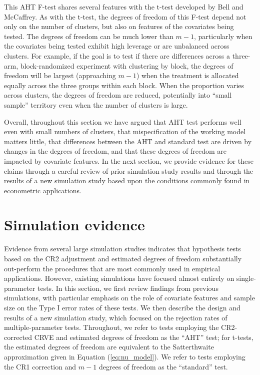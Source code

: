 \documentclass[12pt]{article}
\begin{document}
This AHT F-test shares several features with the t-test developed by Bell and McCaffrey. As with the t-test, the degrees of freedom of this F-test depend not only on the number of clusters, but also on features of the covariates being tested. 
The degrees of freedom can be much lower than $m - 1$, particularly when the covariates being tested exhibit high leverage or are unbalanced across clusters. 
For example, if the goal is to test if there are differences across a three-arm, block-randomized experiment with clustering by block, the degrees of freedom will be largest (approaching $m - 1$) when the treatment is allocated equally across the three groups within each block. 
When the proportion varies across clusters, the degrees of freedom are reduced, potentially into ``small sample'' territory even when the number of clusters is large. 

Overall, throughout this section we have argued that AHT test performs well even with small numbers of clusters, that mispecification of the working model matters little, that differences between the AHT and standard test are driven by changes in the degrees of freedom, and that these degrees of freedom are impacted by covariate features. 
In the next section, we provide evidence for these claims through a careful review of prior simulation study results and through the results of a new simulation study based upon the conditions commonly found in econometric applications.

\section{Simulation evidence}
\label{sec:simulation}

Evidence from several large simulation studies indicates that hypothesis tests based on the CR2 adjustment and estimated degrees of freedom substantially out-perform the procedures that are most commonly used in empirical applications.
However, existing simulations have focused almost entirely on single-parameter tests. 
In this section, we first review findings from previous simulations, with particular emphasis on the role of covariate features and sample size on the Type I error rates of these tests.
We then describe the design and results of a new simulation study, which focused on the rejection rates of multiple-parameter tests.
  Throughout, we refer to tests employing the CR2-corrected CRVE and estimated degrees of freedom as the ``AHT'' test; for t-tests, the estimated degrees of freedom are equivalent to the Satterthwaite approximation given in Equation (\ref{eq:nu_model}). 
We refer to tests employing the CR1 correction and $m - 1$ degrees of freedom as the ``standard'' test. 
\end{document}
